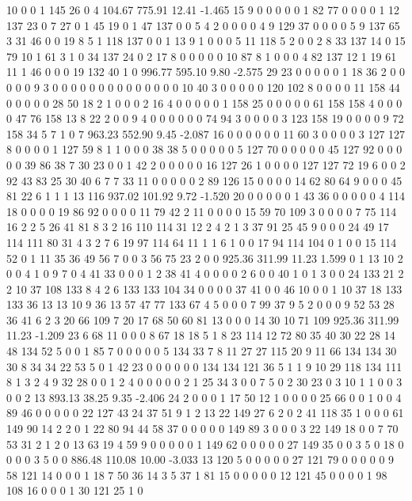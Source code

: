  10 0 0 1 145 26 0 4
104.67 775.91 12.41 -1.465
 15 9 0 0 0 0 0 1 82 77 0 0 0 0 1 12 137 23 0 7
 27 0 1 45 19 0 1 47 137 0 0 5 4 2 0 0 0 0 4 9
 129 37 0 0 0 0 5 9 137 65 3 31 46 0 0 19 8 5 1 118
 137 0 0 1 13 9 1 0 0 0 5 11 118 5 2 0 0 2 8 33
 137 14 0 15 79 10 1 61 3 1 0 34 137 24 0 2 17 8 0 0
 0 0 0 10 87 8 1 0 0 0 4 82 137 12 1 19 61 11 1 46
 0 0 0 19 132 40 1 0
996.77 595.10 9.80 -2.575
 29 23 0 0 0 0 0 1 18 36 2 0 0 0 0 0 9 3 0 0
 0 0 0 0 0 0 0 0 0 0 0 0 10 40 3 0 0 0 0 0
 120 102 8 0 0 0 0 11 158 44 0 0 0 0 0 28 50 18 2 1
 0 0 0 2 16 4 0 0 0 0 0 1 158 25 0 0 0 0 0 61
 158 158 4 0 0 0 0 47 76 158 13 8 22 2 0 0 9 4 0 0
 0 0 0 0 74 94 3 0 0 0 0 3 123 158 19 0 0 0 0 9
 72 158 34 5 7 1 0 7
963.23 552.90 9.45 -2.087
 16 0 0 0 0 0 0 11 60 3 0 0 0 0 3 127 127 8 0 0
 0 0 1 127 59 8 1 1 0 0 0 38 38 5 0 0 0 0 0 5
 127 70 0 0 0 0 0 45 127 92 0 0 0 0 0 39 86 38 7 30
 23 0 0 1 42 2 0 0 0 0 0 16 127 26 1 0 0 0 0 127
 127 72 19 6 0 0 2 92 43 83 25 30 40 6 7 7 33 11 0 0
 0 0 0 2 89 126 15 0 0 0 0 14 62 80 64 9 0 0 0 45
 81 22 6 1 1 1 13 116
937.02 101.92 9.72 -1.520
 20 0 0 0 0 0 1 43 36 0 0 0 0 0 4 114 18 0 0 0
 0 19 86 92 0 0 0 0 11 79 42 2 11 0 0 0 0 15 59 70
 109 3 0 0 0 0 7 75 114 16 2 2 5 26 41 81 8 3 2 16
 110 114 31 12 2 4 2 1 3 37 91 25 45 9 0 0 0 24 49 17
 114 111 80 31 4 3 2 7 6 19 97 114 64 11 1 1 6 1 0 0
 17 94 114 104 0 1 0 0 15 114 52 0 1 11 35 36 49 56 7 0
 0 3 56 75 23 2 0 0
925.36 311.99 11.23 1.599
 0 1 13 10 2 0 0 4 1 0 9 7 0 4 41 33 0 0 0 1
 2 38 41 4 0 0 0 0 2 6 0 0 40 1 0 1 3 0 0 24
 133 21 2 2 10 37 108 133 8 4 2 6 133 133 104 34 0 0 0 0
 37 41 0 0 46 10 0 0 1 10 37 18 133 133 36 13 13 10 9 36
 13 57 47 77 133 67 4 5 0 0 0 7 99 37 9 5 2 0 0 0
 9 52 53 28 36 41 6 2 3 20 66 109 7 20 17 68 50 60 81 13
 0 0 0 14 30 10 71 109
925.36 311.99 11.23 -1.209
 23 6 68 11 0 0 0 8 67 18 18 5 1 8 23 114 12 72 80 35
 40 30 22 28 14 48 134 52 5 0 0 1 85 7 0 0 0 0 0 5
 134 33 7 8 11 27 27 115 20 9 11 66 134 134 30 30 8 34 34 22
 53 5 0 1 42 23 0 0 0 0 0 0 134 134 121 36 5 1 1 9
 10 29 118 134 111 8 1 3 2 4 9 32 28 0 0 1 2 4 0 0
 0 0 0 2 1 25 34 3 0 0 7 5 0 2 30 23 0 3 10 1
 1 0 0 3 0 0 2 13
893.13 38.25 9.35 -2.406
 24 2 0 0 0 1 17 50 12 1 0 0 0 0 25 66 0 0 1 0
 0 4 89 46 0 0 0 0 0 22 127 43 24 37 51 9 1 2 13 22
 149 27 6 2 0 2 41 118 35 1 0 0 0 61 149 90 14 2 2 0
 1 22 80 94 44 58 37 0 0 0 0 0 149 89 3 0 0 0 3 22
 149 18 0 0 7 70 53 31 2 1 2 0 13 63 19 4 59 9 0 0
 0 0 0 1 149 62 0 0 0 0 0 27 149 35 0 0 3 5 0 18
 0 0 0 0 3 5 0 0
886.48 110.08 10.00 -3.033
 13 120 5 0 0 0 0 0 27 121 79 0 0 0 0 0 9 58 121 14
 0 0 0 1 18 7 50 36 14 3 5 37 1 81 15 0 0 0 0 0
 12 121 45 0 0 0 0 1 98 108 16 0 0 0 1 30 121 25 1 0

